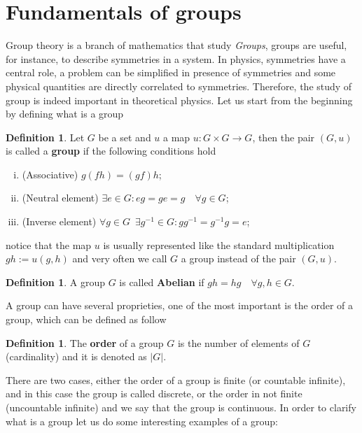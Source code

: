 \documentclass[12pt]{book}
\theoremstyle{plain}
\theoremstyle{definition}
\newtheorem{dfn}[thm]{Definition}
\theoremstyle{remark}
\begin{document}
\section{Fundamentals of groups}
Group theory is a branch of mathematics that study \emph{Groups}, groups are useful, for instance, to describe symmetries in a system. In physics, symmetries have a central role, a problem can be simplified in presence of symmetries and some physical quantities are directly correlated to symmetries. Therefore, the study of group is indeed important in theoretical physics.
Let us start from the beginning by defining what is a group
\begin{dfn}
Let $G$ be a set and $u$ a map $u:G\times G\to G$, then the pair $(G,u)$ is called a \textbf{group} if the following conditions hold
\begin{enumerate}[i.]
\item (Associative) $g(fh) = (gf)h$;
\item (Neutral element) $\exists e\in G: eg=ge=g\quad\forall g\in G$;
\item (Inverse element) $\forall g\in G\,$ $\exists g^{-1}\in G: gg^{-1} = g^{-1}g=e$;
\end{enumerate}
notice that the map $u$ is usually represented like the standard multiplication $gh:=u(g,h)$ and very often we call $G$ a group instead of the pair $(G,u)$.
\end{dfn}
\begin{dfn}
A group $G$ is called \textbf{Abelian} if $gh=hg\quad \forall g,h\in G$.
\end{dfn}
A group can have several proprieties, one of the most important is the order of a group, which can be defined as follow
\begin{dfn}
The \textbf{order} of a group $G$ is the number of elements of $G$ (cardinality) and it is denoted as $|G|$. 
\end{dfn}
There are two cases, either the order of a group is finite (or countable infinite), and in this case the group is called discrete, or the order in not finite (uncountable infinite) and we say that the group is continuous. In order to clarify what is a group let us do some interesting examples of a group:
\end{document}
